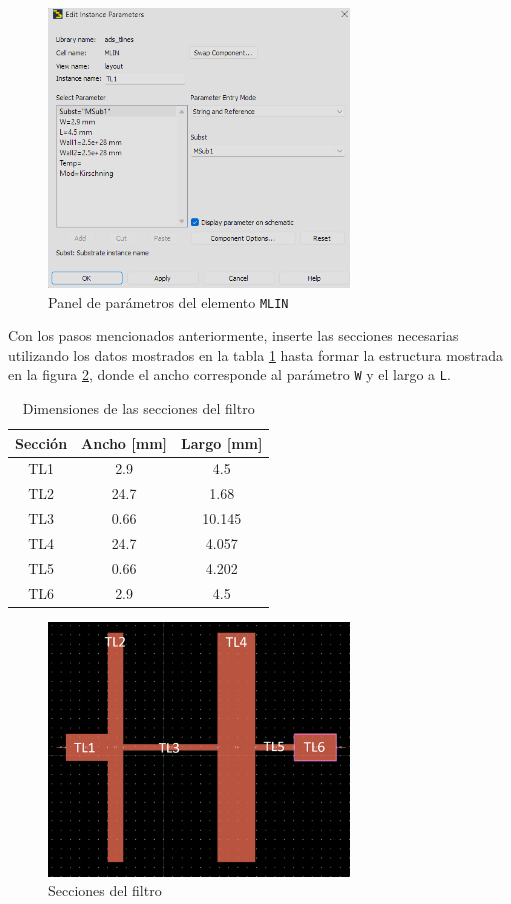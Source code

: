 \begin{figure}[h!]
    \centering
    \includegraphics[width=8cm]{figures/metodologia/metologia2.png}
    \caption{Panel de parámetros del elemento \texttt{MLIN}}
    \label{fig:metologia_mlin_dimensiones}
\end{figure}

Con los pasos mencionados anteriormente, inserte las secciones necesarias utilizando los datos mostrados en la tabla \ref{table:metodologia_dimensiones} hasta formar la estructura mostrada en la figura \ref{fig:metologia_secciones_filtro}, donde el ancho corresponde al parámetro \texttt{W} y el largo a \texttt{L}.

\begin{table}[h!]
\centering
\caption{Dimensiones de las secciones del filtro}
\label{table:metodologia_dimensiones}
\begin{tabular}{|c|c|c|}
\hline
Sección & Ancho {[}mm{]} & Largo {[}mm{]} \\ \hline
TL1     & 2.9            & 4.5            \\ \hline
TL2     & 24.7           & 1.68           \\ \hline
TL3     & 0.66           & 10.145         \\ \hline
TL4     & 24.7           & 4.057          \\ \hline
TL5     & 0.66           & 4.202          \\ \hline
TL6     & 2.9            & 4.5            \\ \hline
\end{tabular}
\end{table}

\begin{figure}[h!]
    \centering
    \includegraphics[width=8cm]{figures/metodologia/metologia3.png}
    \caption{Secciones del filtro}
    \label{fig:metologia_secciones_filtro}
\end{figure}

